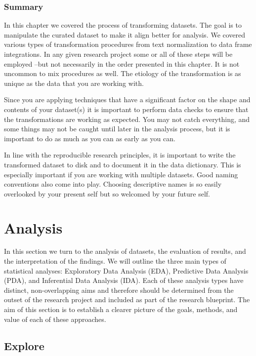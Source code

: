 \documentclass[
  letterpaper,
  DIV=11,
  numbers=noendperiod]{scrreprt}
\theoremstyle{definition}
\theoremstyle{remark}
\begin{document}
\section*{Summary}\label{summary-6}


In this chapter we covered the process of transforming datasets. The
goal is to manipulate the curated dataset to make it align better for
analysis. We covered various types of transformation procedures from
text normalization to data frame integrations. In any given research
project some or all of these steps will be employed --but not
necessarily in the order presented in this chapter. It is not uncommon
to mix procedures as well. The etiology of the transformation is as
unique as the data that you are working with.

Since you are applying techniques that have a significant factor on the
shape and contents of your dataset(s) it is important to perform data
checks to ensure that the transformations are working as expected. You
may not catch everything, and some things may not be caught until later
in the analysis process, but it is important to do as much as you can as
early as you can.

In line with the reproducible research principles, it is important to
write the transformed dataset to disk and to document it in the data
dictionary. This is especially important if you are working with
multiple datasets. Good naming conventions also come into play. Choosing
descriptive names is so easily overlooked by your present self but so
welcomed by your future self.

\part{Analysis}

In this section we turn to the analysis of datasets, the evaluation of
results, and the interpretation of the findings. We will outline the
three main types of statistical analyses: Exploratory Data Analysis
(EDA), Predictive Data Analysis (PDA), and Inferential Data Analysis
(IDA). Each of these analysis types have distinct, non-overlapping aims
and therefore should be determined from the outset of the research
project and included as part of the research blueprint. The aim of this
section is to establish a clearer picture of the goals, methods, and
value of each of these approaches.

\chapter{Explore}\label{sec-exploration}
\end{document}
